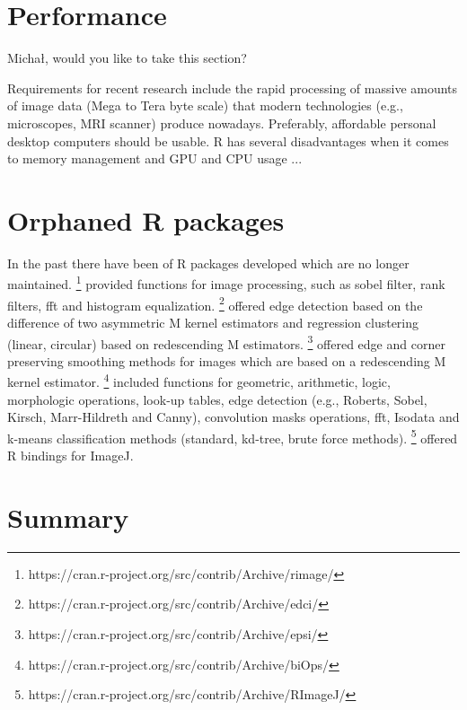 \section{Performance}

Micha\l{}, would you like to take this section?


Requirements for recent research include the rapid processing of massive amounts 
of image data (Mega to Tera byte scale) that modern technologies (e.g., 
microscopes, MRI scanner) produce nowadays. Preferably, affordable personal desktop
computers should be usable. R has several disadvantages when it comes to memory management
and GPU and CPU usage ...

\section{Orphaned R packages}

In the past there have been of R packages developed which are no longer 
maintained. 
\footnote{https://cran.r-project.org/src/contrib/Archive/rimage/ 
} provided functions for image processing, such as sobel filter, rank filters, 
fft and histogram equalization. 
\footnote{https://cran.r-project.org/src/contrib/Archive/edci/} 
offered edge detection based on the difference of two asymmetric M kernel 
estimators and regression clustering (linear, circular) based on redescending M 
estimators. 
\footnote{https://cran.r-project.org/src/contrib/Archive/epsi/} 
offered edge and corner preserving smoothing methods for images which are based 
on a redescending M kernel estimator. 
\footnote{https://cran.r-project.org/src/contrib/Archive/biOps/} 
included functions for geometric, arithmetic, logic, morphologic operations, 
look-up tables, edge detection (e.g., Roberts, Sobel, Kirsch, Marr-Hildreth and 
Canny), convolution masks operations, fft, Isodata and k-means classification methods 
(standard, kd-tree, brute force methods). \footnote{ 
https://cran.r-project.org/src/contrib/Archive/RImageJ/} offered R bindings for 
ImageJ.

\section{Summary}

